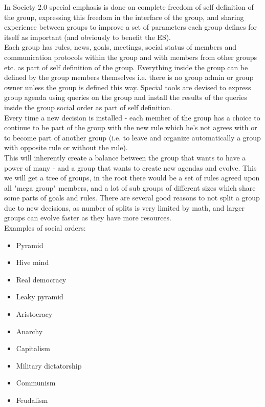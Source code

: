 \documentclass{article}
\begin{document}
In Society 2.0 special emphasis is done on complete freedom of self definition of the group, expressing this freedom in the interface of the group, and sharing experience between groups to improve a set of parameters each group defines for itself as important (and obviously to benefit the ES).\\

Each group has rules, news, goals, meetings, social status of members and communication protocols within the group and with members from other groups etc. as part of self definition of the group. Everything inside the group can be defined by the group members themselves i.e. there is no group admin or group owner unless the group is defined this way. Special tools are devised to express group agenda using queries on the group and install the results of the queries inside the group social order as part of self definition. \\

Every time a new decision is installed - each member of the group has a choice to continue to be part of the group with the new rule which he's not agrees with or to become part of another group (i.e. to leave and organize automatically a group with opposite rule or without the rule). \\

This will inherently create a balance between the group that wants to have a power of many - and a group that wants to create new agendas and evolve. This we will get a tree of groups, in the root there would be a set of rules agreed upon all "mega group" members, and a lot of sub groups of different sizes which share some parts of goals and rules. There are several good reasons to not split a group due to new decisions, as number of splits is very limited by math, and larger groups can evolve faster as they have more resources. \\

Examples of social orders: 
\begin{itemize} 
	\item Pyramid
	\item Hive mind
	\item Real democracy
	\item Leaky pyramid
	\item Aristocracy
	\item Anarchy
	\item Capitalism
	\item Military dictatorship 
	\item Communism 
	\item Feudalism
\end{itemize}
\end{document}
